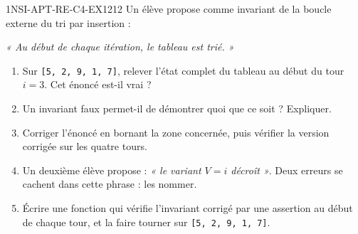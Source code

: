 

\begin{exercice}{1NSI-APT-RE-C4-EX1}{2}{12}
Un élève propose comme invariant de la boucle externe du tri par insertion :

\medskip
\emph{« Au début de chaque itération, le tableau est trié. »}
\medskip

\begin{enumerate}
  \item Sur \lstinline{[5, 2, 9, 1, 7]}, relever l'état complet du tableau au début du tour
    $i=3$. Cet énoncé est-il vrai ?
  \item Un invariant faux permet-il de démontrer quoi que ce soit ? Expliquer.
  \item Corriger l'énoncé en bornant la zone concernée, puis vérifier la version corrigée
    sur les quatre tours.
  \item Un deuxième élève propose : \emph{« le variant $V = i$ décroît »}. Deux erreurs se
    cachent dans cette phrase : les nommer.
  \item Écrire une fonction qui vérifie l'invariant corrigé par une assertion au début de
    chaque tour, et la faire tourner sur \lstinline{[5, 2, 9, 1, 7]}.
\end{enumerate}
\end{exercice}

